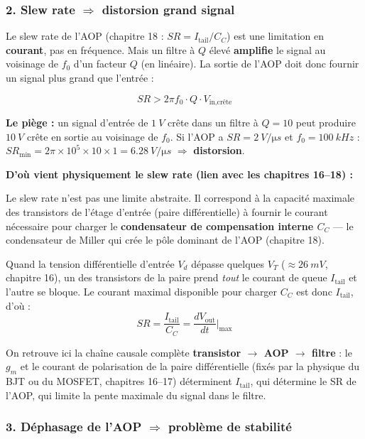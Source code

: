 \documentclass[12pt,a4paper,twoside]{book}
\begin{document}
\subsubsection*{2. Slew rate $\Rightarrow$ distorsion grand signal}

\begin{attention}
Le slew rate de l'AOP (chapitre 18 : $SR = I_{\text{tail}}/C_C$) est une limitation en \textbf{courant}, pas en fréquence. Mais un filtre à $Q$ élevé \textbf{amplifie} le signal au voisinage de $f_0$ d'un facteur $Q$ (en linéaire). La sortie de l'AOP doit donc fournir un signal plus grand que l'entrée :

\[
\boxed{SR > 2\pi f_0 \cdot Q \cdot V_{\text{in,crête}}}
\]

\textbf{Le piège :} un signal d'entrée de $\SI{1}{V}$ crête dans un filtre à $Q = 10$ peut produire $\SI{10}{V}$ crête en sortie au voisinage de $f_0$. Si l'AOP a $SR = \SI{2}{V/\micro s}$ et $f_0 = \SI{100}{kHz}$ : $SR_{\min} = 2\pi\times10^5\times10\times1 = \SI{6.28}{V/\micro s}$ $\Rightarrow$ \textbf{distorsion}.
\end{attention}

\begin{intuition}
\textbf{D'où vient physiquement le slew rate (lien avec les chapitres 16--18) :}

Le slew rate n'est pas une limite abstraite. Il correspond à la capacité maximale des transistors de l'étage d'entrée (paire différentielle) à fournir le courant nécessaire pour charger le \textbf{condensateur de compensation interne $C_C$} --- le condensateur de Miller qui crée le pôle dominant de l'AOP (chapitre 18).

Quand la tension différentielle d'entrée $V_d$ dépasse quelques $V_T$ ($\approx \SI{26}{mV}$, chapitre 16), un des transistors de la paire prend \textit{tout} le courant de queue $I_{\text{tail}}$ et l'autre se bloque. Le courant maximal disponible pour charger $C_C$ est donc $I_{\text{tail}}$, d'où :
\[
SR = \frac{I_{\text{tail}}}{C_C} = \frac{dV_{\text{out}}}{dt}\bigg|_{\max}
\]

On retrouve ici la chaîne causale complète \textbf{transistor $\to$ AOP $\to$ filtre} : le $g_m$ et le courant de polarisation de la paire différentielle (fixés par la physique du BJT ou du MOSFET, chapitres 16--17) déterminent $I_{\text{tail}}$, qui détermine le SR de l'AOP, qui limite la pente maximale du signal dans le filtre.
\end{intuition}

\subsubsection*{3. Déphasage de l'AOP $\Rightarrow$ problème de stabilité}
\end{document}
